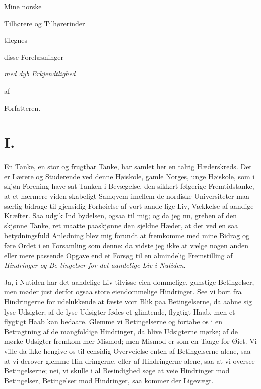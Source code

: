 \documentclass[12pt]{book}
\newcommand{\opage}[1]{\marginnote{\footnotesize\textit{[#1]}}}
\begin{document}
\cleardoublepage
\thispagestyle{empty}
\vspace*{\fill}
\begin{center}
Mine norske\par
\bigskip
{\Large Tilhørere og Tilhørerinder}\par
\medskip
{\small tilegnes}\par
\medskip
{\large disse Forelæsninger}\par
\bigskip
\emph{med dyb Erkjendtlighed}\par
\bigskip
af\par
\bigskip
Forfatteren.\par
\end{center}
\vspace*{\fill}
\cleardoublepage

\tableofcontents

\mainmatter

\chapter*{I.}
\label{ch:i}
\opage{1}\setcounter{footnote}{0}%
En Tanke, en stor og frugtbar Tanke, har samlet her
en talrig Hæderskreds. Det er Lærere og Studerende
ved denne Høiskole, gamle Norges, unge Høiskole, som
i skjøn Forening have sat Tanken i Bevægelse, den
sikkert følgerige Fremtidstanke, at et nærmere viden\-%
skabeligt Samqvem imellem de nordiske Universiteter
maa særlig bidrage til gjensidig Forhøielse af vort aande\-%
lige Liv, Vækkelse af aandige Kræfter. Saa udgik Ind\-%
bydelsen, ogsaa til mig; og da jeg nu, greben af den
skjønne Tanke, ret maatte paaskjønne den sjeldne Hæder,
at det ved en saa betydningsfuld Anledning blev mig
forundt at fremkomme med mine Bidrag og føre Ordet
i en Forsamling som denne: da vidste jeg ikke at vælge
nogen anden eller mere passende Opgave end et Forsøg
til en almindelig Fremstilling af \emph{Hindringer og Be\-%
tingelser for det aandelige Liv i Nutiden}.

Ja, i Nutiden har det aandelige Liv tilvisse eien\-%
dommelige, gunstige Betingelser, men møder just derfor
ogsaa store eiendommelige Hindringer. See vi bort fra
Hindringerne for udelukkende at fæste vort Blik paa
\opage{2}\setcounter{footnote}{0}%
Betingelserne, da aabne sig lyse Udsigter; af de lyse
Udsigter fødes et glimtende, flygtigt Haab, men et flygtigt
Haab kan bedaare. Glemme vi Betingelserne og fortabe
os i en Betragtning af de mangfoldige Hindringer, da
blive Udsigterne mørke; af de mørke Udsigter fremkom\-%
mer Mismod; men Mismod er som en Taage for Øiet.
Vi ville da ikke hengive os til eensidig Overveielse enten
af Betingelserne alene, saa at vi derover glemme Hin\-%
dringerne, eller af Hindringerne alene, saa at vi oversee
Betingelserne; nei, vi skulle i al Besindighed søge at veie
Hindringer mod Betingelser, Betingelser mod Hindringer,
saa kommer der Ligevægt.
\end{document}
